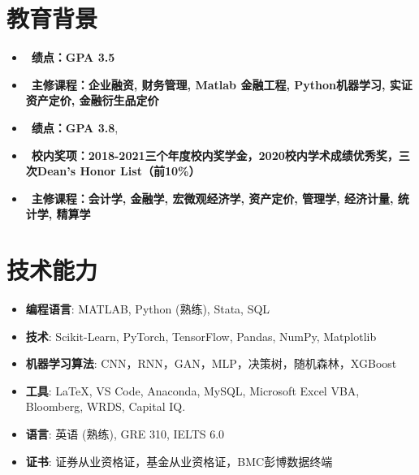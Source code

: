 \documentclass{resume}
\begin{document}
\section{教育背景}
\begin{itemize}[itemsep=0.2ex, parsep=0ex]
\item\ \textbf{绩点：GPA 3.5} 
\item\ \textbf{主修课程：企业融资, 财务管理, Matlab 金融工程, Python机器学习, 实证资产定价, 金融衍生品定价}
 \end{itemize}
 \vspace{-5pt}
\begin{itemize}[itemsep=0.2ex, parsep=0ex]
\item\ \textbf{绩点：GPA 3.8},
\item\ \textbf{校内奖项：2018-2021三个年度校内奖学金，2020校内学术成绩优秀奖，三次Dean's Honor List（前10\%）}
\item\ \textbf{主修课程：会计学, 金融学, 宏微观经济学, 资产定价, 管理学, 经济计量, 统计学, 精算学}
 \end{itemize}
 \vspace{-7pt}
\section{技术能力}
\begin{itemize}[parsep=0.2ex]
  \item \textbf{编程语言}: MATLAB, Python (熟练), Stata, SQL
  \item \textbf{技术}: Scikit-Learn, PyTorch, TensorFlow, Pandas, NumPy, Matplotlib
  \item \textbf{机器学习算法}: CNN，RNN，GAN，MLP，决策树，随机森林，XGBoost
  \item \textbf{工具}{: \LaTeX{}, VS Code, Anaconda, MySQL, Microsoft Excel VBA, Bloomberg, WRDS, Capital IQ.} 
  \item\textbf{语言}{: 英语 (熟练), GRE 310, IELTS 6.0}
  \item\textbf{证书}{: 证券从业资格证，基金从业资格证，BMC彭博数据终端} \\
\end{itemize}
\end{document}

